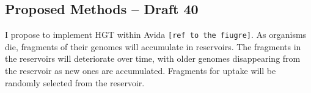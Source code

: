 \subsection{Proposed Methods – Draft 40}

I propose to implement HGT within Avida \verb|[ref to the fiugre]|.  As organisms die, fragments of their genomes will accumulate in reservoirs.  The fragments in the reservoirs will deteriorate over time, with older genomes disappearing from the reservoir as new ones are accumulated. Fragments for uptake will be randomly selected from the reservoir.  

